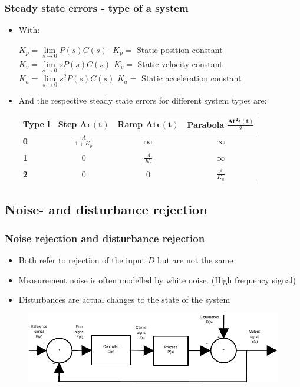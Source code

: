 \begin{frame}
	\frametitle{Steady state errors - type of a system}
	\begin{itemize}
		\item With:
			\begin{tabbing}
			$K_p = \lim\limits_{s \rightarrow 0} P(s)C(s)$ 
			\hspace{2em} \= $K_p = $ Static position constant \\
			$K_v = \lim\limits_{s \rightarrow 0}s P(s)C(s)$ \> $K_v = $ Static velocity constant \\
			$K_a = \lim\limits_{s \rightarrow 0}s^2 P(s)C(s)$ \> $K_a = $ Static acceleration constant
			\end{tabbing}
		\item And the respective steady state errors for different system types are:
		\begin{tabular}{|l|c|c|c|}
			\hline \textbf{Type} $\mathbf{l}$ & \textbf{Step} $\mathbf{A \boldsymbol{\epsilon} (t)}$ & \textbf{Ramp} $\mathbf{At \boldsymbol{\epsilon} (t)}$ & \textbf{Parabola} $\mathbf{\frac{At^2 \boldsymbol{\epsilon} (t)}{2}}$ \\ 
			\hline \textbf{0} & $\frac{A}{1 + K_p}$ & $\infty$ & $\infty$ \\ 
			\hline \textbf{1} & 0 & $\frac{A}{K_v}$ & $\infty$ \\ 
			\hline \textbf{2} & 0 & 0 & $\frac{A}{K_a}$ \\ 
			\hline 
		\end{tabular} 
	\end{itemize}
\end{frame}


\subsection[Noise- and disturbance rejection]{Noise- and disturbance rejection}

\begin{frame}
	\frametitle{Noise rejection and disturbance rejection}
	\begin{itemize}
		\item Both refer to rejection of the input $D$ but are not the same
		\item Measurement noise is often modelled by white noise. (High frequency signal)
		\item Disturbances are actual changes to the state of the system
	\end{itemize}
\begin{figure}
\centering
\includegraphics[width=0.7\linewidth]{Closed-Loop}
\label{fig:Closed-Loop3}
\end{figure}
\end{frame}


